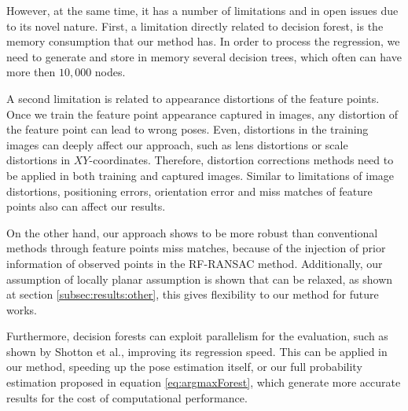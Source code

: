 \documentclass[annual]{acmsiggraph}
\begin{document}
However, at the same time, it has a number of limitations and in open issues due to its novel nature. First, a limitation directly related to decision forest, is the memory consumption that our method has. In order to process the regression, we need to generate and store in memory several decision trees, which often can have more then $10,000$ nodes.


A second limitation is related to appearance distortions of the feature points. Once we train the feature point appearance captured in images, any distortion of the feature point can lead to wrong poses. Even, distortions in the training images can deeply affect our approach, such as lens distortions or scale distortions in $XY$-coordinates. Therefore, distortion corrections methods \cite{Zhang:2000} need to be applied in both training and captured images. Similar to limitations of image distortions, positioning errors, orientation error and miss matches of feature points also can affect our results.       

On the other hand, our approach shows to be more robust than conventional methods through feature points miss matches, because of the injection of prior information of observed points in the RF-RANSAC method. Additionally, our assumption of locally planar assumption is shown that can be relaxed, as shown at section \ref{subsec:results:other}, this gives flexibility to our method for future works. 

Furthermore, decision forests can exploit parallelism for the evaluation, such as shown by Shotton et al.\cite{Shotton:2013}, improving its regression speed. This can be applied in our method, speeding up the pose estimation itself, or our full probability estimation proposed in equation \eqref{eq:argmaxForest}, which generate more accurate results for the cost of computational performance.
\end{document}
